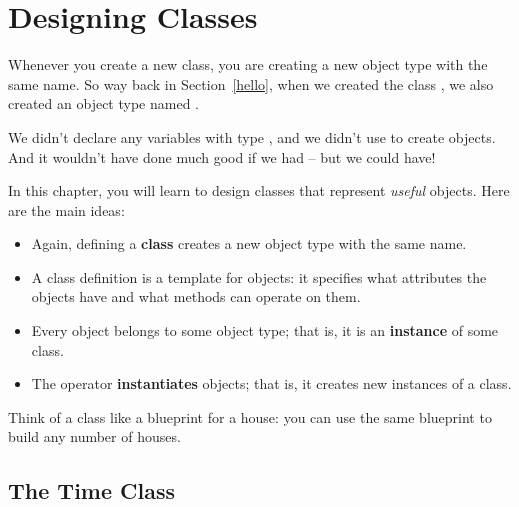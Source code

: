 \chapter{Designing Classes}


Whenever you create a new class, you are creating a new object type with the same name.
So way back in Section~\ref{hello}, when we created the class , we also created an object type named .

We didn't declare any variables with type , and we didn't use  to create  objects.
And it wouldn't have done much good if we had -- but we could have!

In this chapter, you will learn to design classes that represent {\em useful} objects.  Here are the main ideas:

\begin{itemize}

\item Again, defining a {\bf class} creates a new object type with the same name.


\item A class definition is a template for objects: it specifies what attributes the objects have and what methods can operate on them.


\item Every object belongs to some object type; that is, it is an {\bf instance} of some class.


\item The  operator {\bf instantiates} objects; that is, it creates new instances of a class.



\end{itemize}

Think of a class like a blueprint for a house: you can use the same blueprint to build any number of houses.

\section{The Time Class}


